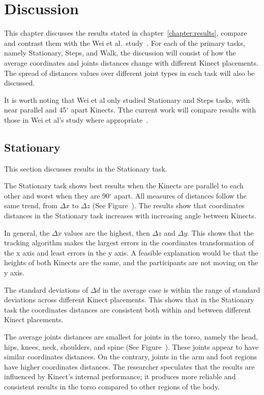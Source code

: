 


\chapter{Discussion}

\label{chapter:discussion}

This chapter discusses the results stated in chapter~\ref{chapter:results}, compare and contrast them with the Wei et al.\ study~\cite{wei_kinect_calibration}. For each of the primary tasks, namely Stationary, Steps, and Walk, the discussion will consist of how the average coordinates and joints distances change with different Kinect placements. The spread of distances values over different joint types in each task will also be discussed.

It is worth noting that Wei et al only studied Stationary and Steps tasks, with near parallel and 45$^{\circ}$ apart Kinects. Tthe current work will compare results with those in Wei et al's study where appropriate~\cite{wei_kinect_calibration}.

\section{Stationary}
\label{sec:discussion_stationary}

This section discusses results in the Stationary task.

The Stationary task shows best results when the Kinects are parallel to each other and worst when they are 90$^{\circ}$ apart. All measures of distances follow the same trend, from $\Delta x$ to $\Delta z$ (See Figure~). The results show that coordinates distances in the Stationary task increases with increasing angle between Kinects.

In general, the $\Delta x$ values are the highest, then $\Delta z$ and $\Delta y$. This shows that the tracking algorithm makes the largest errors in the coordinates transformation of the x axis and least errors in the y axis. A feasible explanation would be that the heights of both Kinects are the same, and the participants are not moving on the y axis.

The standard deviations of $\Delta d$ in the average case is within the range of standard deviations across different Kinect placements. This shows that in the Stationary task the coordinates distances are consistent both within and between different Kinect placements.

The average joints distances are smallest for joints in the torso, namely the head, hips, knees, neck, shoulders, and spine (See Figure~). These joints appear to have similar coordinates distances. On the contrary, joints in the arm and foot regions have higher coordinates distances. The researcher speculates that the results are influenced by Kinect's internal performance; it produces more reliable and consistent results in the torso compared to other regions of the body.

